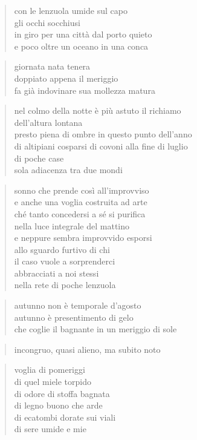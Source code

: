 	\begin{verse}
		con le lenzuola umide sul capo\\
		gli occhi socchiusi\\
		in giro per una città dal porto quieto\\
		e poco oltre un oceano in una conca
	\end{verse}

\clearpage


	\begin{verse}
		giornata nata tenera\\
		doppiato appena il meriggio\\
		fa già indovinare sua mollezza matura
	\end{verse}

\clearpage


	\begin{verse}
		nel colmo della notte è più astuto il richiamo\\
		dell'altura lontana\\
		presto piena di ombre in questo punto dell'anno\\
		di altipiani cosparsi di covoni alla fine di luglio\\
		di poche case\\
		sola adiacenza tra due mondi
	\end{verse}

\clearpage


	\begin{verse}
		sonno che prende così all'improvviso\\
		e anche una voglia costruita ad arte\\
		ché tanto concedersi a sé si purifica\\
		nella luce integrale del mattino\\
		e neppure sembra improvvido esporsi\\
		allo sguardo furtivo di chi\\
		il caso vuole a sorprenderci\\
		abbracciati a noi stessi\\
		nella rete di poche lenzuola
	\end{verse}

\clearpage


	\begin{verse}
		autunno non è temporale d'agosto\\
		autunno è presentimento di gelo\\
		che coglie il bagnante in un meriggio di sole
	\end{verse}

	\begin{verse}
		incongruo, quasi alieno, ma subito noto
	\end{verse}

\clearpage


	\begin{verse}
		voglia di pomeriggi\\
		di quel miele torpido\\
		di odore di stoffa bagnata\\
		di legno buono che arde\\
		di ecatombi dorate sui viali\\
		di sere umide e mie
	\end{verse}
